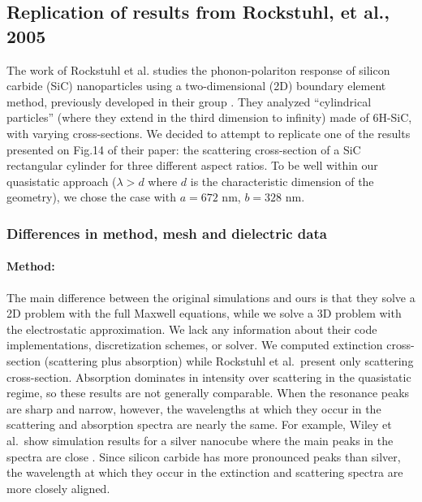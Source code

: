 \subsection{Replication of results from Rockstuhl, et al., 2005}\label{sec:replication1}

The work of Rockstuhl et al.\cite{rockstuhl2005} studies the phonon-polariton response of silicon carbide (SiC)
nanoparticles using a two-dimensional (2D) boundary element method, 
previously developed in their group \cite{rockstuhl2003}. 
They analyzed ``cylindrical particles'' (where they extend in the third dimension to infinity) made of 6H-SiC, with varying cross-sections.
We decided to attempt to replicate one of the results presented on Fig.14 of their paper:
the scattering cross-section of a SiC rectangular cylinder for three different aspect ratios. 
To be well within our quasistatic approach ($\lambda > d$ where $d$ is the characteristic
dimension of the geometry), we chose the case with $a=672$ nm, $b=328$ nm.

\subsubsection{Differences in method, mesh and dielectric data}

\paragraph{Method:} The main difference between the original simulations and ours is that they solve a 2D problem with the 
full Maxwell equations, while we solve a 3D problem with the electrostatic approximation. 
We lack any information about their code implementations, discretization schemes, or solver.  
We computed extinction cross-section (scattering plus absorption) while Rockstuhl et al.\ present only scattering cross-section. 
Absorption dominates in intensity over scattering in the quasistatic regime, so these results are not generally comparable. 
When the resonance peaks are sharp and narrow, however, the wavelengths at which they occur in the scattering and absorption spectra are nearly the same.
For example, Wiley et al.\ show simulation results for a silver nanocube where the main peaks in the spectra are close \cite{wiley-etal-2006}.  
Since silicon carbide has more pronounced peaks than silver, the wavelength at which they occur in the extinction and scattering spectra are more closely aligned.

